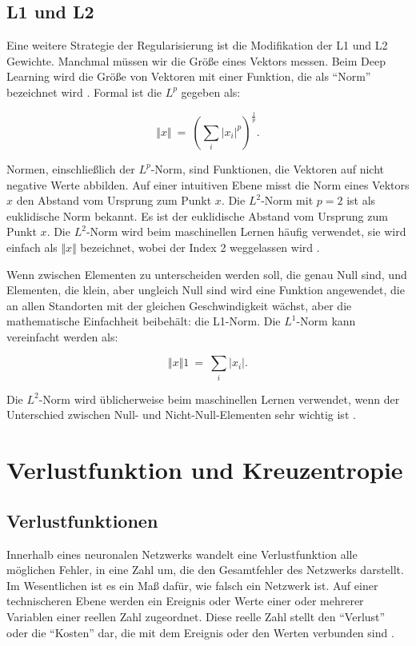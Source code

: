         \subsection{L1 und L2}
        Eine weitere Strategie der Regularisierung ist die Modifikation der L1 und L2 Gewichte. Manchmal müssen wir die Größe eines Vektors messen. Beim Deep Learning wird die Größe von Vektoren mit einer Funktion, die als \enquote{Norm} bezeichnet wird \cite*[39]{IanGoodfellowYoshuaBengio2016}. Formal ist die $L^p$ gegeben als:

        \begin{equation} \label{FormelNorm2}
            \Vert x\Vert \ =\ \left(\sum _{i}\bigr| x_{i}\bigr|^{p}\right)^{\frac{1}{p}}.
        \end{equation}

        Normen, einschließlich der $L^p$-Norm, sind Funktionen, die Vektoren auf nicht negative Werte abbilden. Auf einer intuitiven Ebene misst die Norm eines Vektors $x$ den Abstand vom Ursprung zum Punkt $x$. Die $L^2$-Norm mit $p = 2$ ist als euklidische Norm bekannt. Es ist der euklidische Abstand vom Ursprung zum Punkt $x$. Die $L^2$-Norm wird beim maschinellen Lernen häufig verwendet, sie wird einfach als $\Vert x\Vert$ bezeichnet, wobei der Index 2 weggelassen wird \cite*[39]{IanGoodfellowYoshuaBengio2016}.

        Wenn zwischen Elementen zu unterscheiden werden soll, die genau Null sind, und Elementen, die klein, aber ungleich Null sind wird eine Funktion angewendet, die an allen Standorten mit der gleichen Geschwindigkeit wächst, aber die mathematische Einfachheit beibehält: die L1-Norm. Die $L^1$-Norm kann vereinfacht werden als:

        \begin{equation} \label{FormelNorm1}
            \Vert x\Vert 1\ =\ \sum _{i}\bigr| x_{i}\bigr|.
        \end{equation}

        Die $L^2$-Norm wird üblicherweise beim maschinellen Lernen verwendet, wenn der Unterschied zwischen Null- und Nicht-Null-Elementen sehr wichtig ist \cite*[40]{IanGoodfellowYoshuaBengio2016}.


        \section{Verlustfunktion und Kreuzentropie}
        \subsection{Verlustfunktionen}
        Innerhalb eines neuronalen Netzwerks wandelt eine Verlustfunktion alle möglichen Fehler, in eine Zahl um, die den Gesamtfehler des Netzwerks darstellt. Im Wesentlichen ist es ein Maß dafür, wie falsch ein Netzwerk ist. Auf einer technischeren Ebene werden ein Ereignis oder Werte einer oder mehrerer Variablen einer reellen Zahl zugeordnet. Diese reelle Zahl stellt  den \enquote{Verlust} oder die \enquote{Kosten} dar, die mit dem Ereignis oder den Werten verbunden sind \cite*[61-62]{Taylor2017}.

